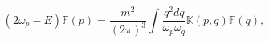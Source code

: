 \begin{equation}
\left( 2\omega _{p}-E\right) \mathbb{F}\left( p\right) =\frac{m^{2}}{\left(
2\pi \right) ^{3}}\int \frac{q^{2}dq}{\omega _{p}\omega _{q}}\mathbb{K}%
\left( p,q\right) \mathbb{F}\left( q\right) ,
\end{equation}

